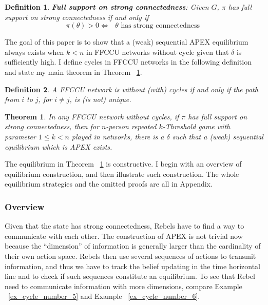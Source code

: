 \documentclass[12pt,letter]{article}
\newtheorem{theorem}{Theorem}
\newtheorem{definition}{Definition}[section]
\theoremstyle{definition}
\theoremstyle{remark}
\theoremstyle{claim}
\begin{document}
\begin{definition}
\textbf{Full support on strong connectedness}: Given $G$, $\pi$ has full support on strong connectedness if and only if 
\[\pi(\theta)>0\Leftrightarrow \text{ $\theta$ has strong connectedness }\] 
\end{definition}  


The goal of this paper is to show that a (weak) sequential APEX equilibrium always exists when $k<n$ in FFCCU networks without cycle given that $\delta$ is sufficiently high. I define cycles in FFCCU networks in the following definition and state my main theorem in Theorem ~\ref{thm_main_result}. 
\begin{definition}
A FFCCU network is without (with) cycles if and only if the path from $i$ to $j$, for $i\neq j$, is (is not) unique. 
\end{definition}

\begin{theorem}
\label{thm_main_result}
In any FFCCU network without cycles, if $\pi$ has full support on strong connectedness, then for $n$-person repeated $k$-Threshold game with parameter $1\leq k < n$ played in networks, there is a $\delta$ such that a (weak) sequential equilibrium which is APEX exists.
\end{theorem}

The equilibrium in Theorem ~\ref{thm_main_result} is constructive. I begin with an overview of equilibrium construction, and then illustrate such construction. The whole equilibrium strategies and the omitted proofs are all in Appendix.  

\subsubsection{Overview}

Given that the state has strong connectedness, Rebels have to find a way to communicate with each other. The construction of APEX is not trivial now because the ``dimension'' of information is generally larger than the cardinality of their own action space. Rebels then use several sequences of actions to transmit information, and thus we have to track the belief updating in the time horizontal line and to check if such sequences constitute an equilibrium. To see that Rebel need to communicate information with more dimensions, compare Example ~\ref{ex_cycle_number_5} and Example ~\ref{ex_cycle_number_6}.
\end{document}
